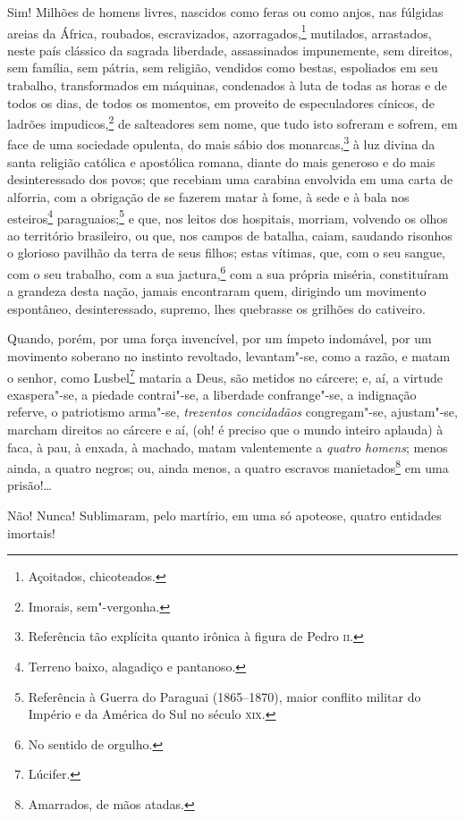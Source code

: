 Sim! Milhões de homens livres, nascidos como feras ou como anjos, nas
fúlgidas areias da África, roubados, escravizados, azorragados,\footnote{
  Açoitados, chicoteados.} mutilados, arrastados, neste país clássico
da sagrada liberdade, assassinados impunemente, sem direitos, sem
família, sem pátria, sem religião, vendidos como bestas, espoliados em
seu trabalho, transformados em máquinas, condenados à luta de todas as
horas e de todos os dias, de todos os momentos, em proveito de
especuladores cínicos, de ladrões impudicos,\footnote{Imorais,
  sem"-vergonha.} de salteadores sem nome, que tudo isto sofreram e
sofrem, em face de uma sociedade opulenta, do mais sábio dos
monarcas,\footnote{Referência tão explícita quanto irônica à figura de
  Pedro \textsc{ii}.} à luz divina da santa religião católica e apostólica
romana, diante do mais generoso e do mais desinteressado dos povos; que
recebiam uma carabina envolvida em uma carta de alforria, com a
obrigação de se fazerem matar à fome, à sede e à bala nos
esteiros\footnote{Terreno baixo, alagadiço e pantanoso.}
paraguaios;\footnote{Referência à Guerra do Paraguai (1865--1870), maior
  conflito militar do Império e da América do Sul no século \textsc{xix}.} e
que, nos leitos dos hospitais, morriam, volvendo os olhos ao território
brasileiro, ou que, nos campos de batalha, caiam, saudando risonhos o
glorioso pavilhão da terra de seus filhos; estas vítimas, que, com o seu
sangue, com o seu trabalho, com a sua jactura,\footnote{No sentido de
  orgulho.} com a sua própria miséria, constituíram a grandeza desta
nação, jamais encontraram quem, dirigindo um movimento espontâneo,
desinteressado, supremo, lhes quebrasse os grilhões do cativeiro.

Quando, porém, por uma força invencível, por um ímpeto indomável, por um
movimento soberano no instinto revoltado, levantam"-se, como a razão, e
matam o senhor, como Lusbel\footnote{Lúcifer.} mataria a Deus, são
metidos no cárcere; e, aí, a virtude exaspera"-se, a piedade contrai"-se,
a liberdade confrange"-se, a indignação referve, o patriotismo arma"-se,
\emph{trezentos concidadãos} congregam"-se, ajustam"-se, marcham direitos
ao cárcere e aí, (oh! é preciso que o mundo inteiro aplauda) à faca, à
pau, à enxada, à machado, matam valentemente a \emph{quatro homens};
menos ainda, a quatro negros; ou, ainda menos, a quatro escravos
manietados\footnote{Amarrados, de mãos atadas.} em uma prisão!\ldots{}

Não! Nunca! Sublimaram, pelo martírio, em uma só apoteose, quatro
entidades imortais!

